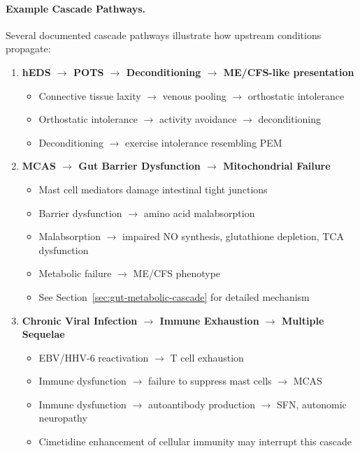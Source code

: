 \paragraph{Example Cascade Pathways.}
Several documented cascade pathways illustrate how upstream conditions propagate:

\begin{enumerate}
    \item \textbf{hEDS $\rightarrow$ POTS $\rightarrow$ Deconditioning $\rightarrow$ ME/CFS-like presentation}
    \begin{itemize}
        \item Connective tissue laxity $\rightarrow$ venous pooling $\rightarrow$ orthostatic intolerance
        \item Orthostatic intolerance $\rightarrow$ activity avoidance $\rightarrow$ deconditioning
        \item Deconditioning $\rightarrow$ exercise intolerance resembling PEM
    \end{itemize}

    \item \textbf{MCAS $\rightarrow$ Gut Barrier Dysfunction $\rightarrow$ Mitochondrial Failure}
    \begin{itemize}
        \item Mast cell mediators damage intestinal tight junctions
        \item Barrier dysfunction $\rightarrow$ amino acid malabsorption
        \item Malabsorption $\rightarrow$ impaired NO synthesis, glutathione depletion, TCA dysfunction
        \item Metabolic failure $\rightarrow$ ME/CFS phenotype
        \item See Section~\ref{sec:gut-metabolic-cascade} for detailed mechanism
    \end{itemize}

    \item \textbf{Chronic Viral Infection $\rightarrow$ Immune Exhaustion $\rightarrow$ Multiple Sequelae}
    \begin{itemize}
        \item EBV/HHV-6 reactivation $\rightarrow$ T cell exhaustion
        \item Immune dysfunction $\rightarrow$ failure to suppress mast cells $\rightarrow$ MCAS
        \item Immune dysfunction $\rightarrow$ autoantibody production $\rightarrow$ SFN, autonomic neuropathy
        \item Cimetidine enhancement of cellular immunity may interrupt this cascade
    \end{itemize}


\end{enumerate}
